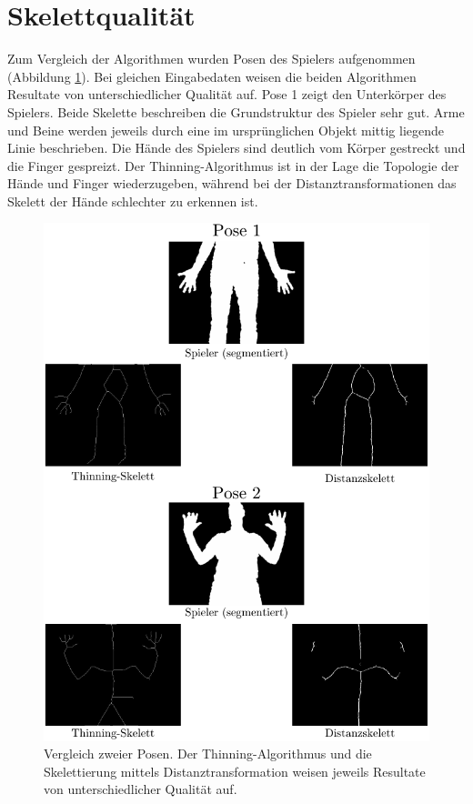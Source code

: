 \section{Skelettqualität}
Zum Vergleich der Algorithmen wurden Posen des Spielers aufgenommen (Abbildung \ref{fig:posen}). Bei gleichen Eingabedaten
weisen die beiden Algorithmen Resultate von unterschiedlicher Qualität auf. Pose 1 zeigt
den Unterkörper des Spielers. Beide Skelette beschreiben die Grundstruktur des Spieler sehr gut. Arme und Beine werden jeweils durch eine im ursprünglichen Objekt mittig liegende Linie beschrieben. Die Hände des Spielers sind deutlich vom Körper gestreckt und die Finger gespreizt. Der Thinning-Algorithmus ist in der Lage die Topologie der Hände und Finger wiederzugeben, während bei der
Distanztransformationen das Skelett der Hände schlechter zu erkennen ist.
\begin{figure}[htbp]
\centering
\includegraphics[width=1.0\linewidth]{./fig/posen.pdf}
\caption{Vergleich zweier Posen. Der Thinning-Algorithmus und die Skelettierung mittels Distanztransformation weisen jeweils Resultate von unterschiedlicher Qualität auf.}
\label{fig:posen}
\end{figure}
